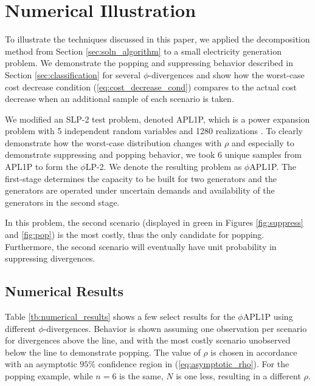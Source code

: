 \documentclass[ijoc,letterpaper]{informs3} %
\newcommand{\plp}{$\phi$LP-2}
\begin{document}
\section{Numerical Illustration} \label{sec:comp_results}

To illustrate the techniques discussed in this paper, we applied the decomposition method from Section \ref{sec:soln_algorithm} to a small electricity generation problem.
We demonstrate the popping and suppressing behavior described in Section \ref{sec:classification} for several $\phi$-divergences and show how the worst-case cost decrease condition (\ref{eq:cost_decrease_cond}) compares to the actual cost decrease when an additional sample of each scenario is taken.

We modified an SLP-2 test problem, denoted APL1P, which is a power expansion problem with 5 independent random variables and 1280 realizations \citep{infanger1992monte}.
To clearly demonstrate how the worst-case distribution changes with $\rho$ and especially to demonstrate suppressing and popping behavior, we took 6 unique samples from APL1P to form the \plp. 
We denote the resulting problem as $\phi$APL1P. 
The first-stage determines the capacity to be built for two generators and the generators are operated under uncertain demands and availability of the generators in the second stage.

In this problem, the second scenario (displayed in green in Figures \ref{fig:suppress} and \ref{fig:pop}) is the most costly, thus the only candidate for popping. %
Furthermore, the second scenario will eventually have unit probability in suppressing divergences.

\subsection{Numerical Results}
\label{ssec:numerical_results}

Table \ref{tb:numerical_results} shows a few select results for the $\phi$APL1P using different $\phi$-divergences.  
Behavior is shown assuming one observation per scenario for divergences above the line, and with the most costly scenario unobserved below the line to demonstrate popping.
The value of $\rho$ is chosen in accordance with an asymptotic $95\%$ confidence region in (\ref{eq:asymptotic_rho}).
For the popping example, while $n=6$ is the same, $N$ is one less, resulting in a different $\rho$. 
\end{document}
